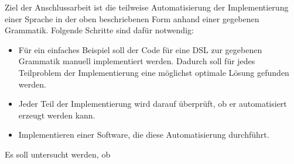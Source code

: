 Ziel der Anschlussarbeit ist die teilweise Automatisierung der Implementierung einer Sprache in der oben beschriebenen Form anhand einer gegebenen Grammatik. Folgende Schritte sind dafür notwendig:
\begin{itemize}
	\item Für ein einfaches Beispiel soll der Code für eine DSL zur gegebenen Grammatik manuell implementiert werden. Dadurch soll für jedes Teilproblem der Implementierung eine möglichst optimale Lösung gefunden werden.
	\item Jeder Teil der Implementierung wird darauf überprüft, ob er automatisiert erzeugt werden kann.
	\item Implementieren einer Software, die diese Automatisierung durchführt.
\end{itemize}

Es soll untersucht werden, ob 